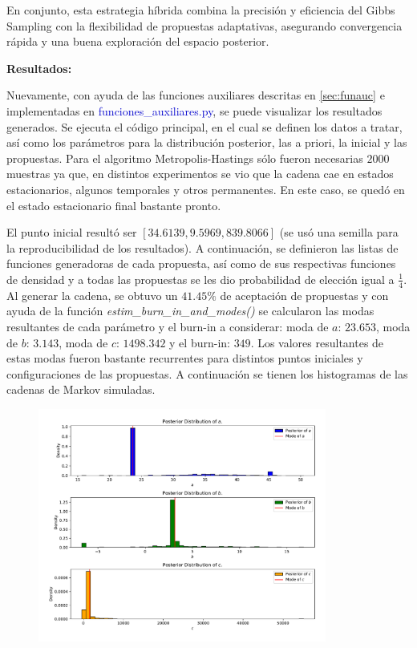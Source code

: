 En conjunto, esta estrategia híbrida combina la precisión y eficiencia del Gibbs Sampling con la flexibilidad de propuestas adaptativas, asegurando convergencia rápida y una buena exploración del espacio posterior.

\textbf{Resultados:}

Nuevamente, con  ayuda de las funciones auxiliares descritas en \ref{sec:funauc} e implementadas en \textcolor{mediumblue}{funciones\_auxiliares.py}, se puede visualizar los resultados generados. Se ejecuta el código principal, en el cual se definen los datos a tratar, así como los parámetros para la distribución posterior, las a priori, la inicial y las propuestas. Para el algoritmo Metropolis-Hastings sólo fueron necesarias $2000$ muestras ya que, en distintos experimentos se vio que la cadena cae en estados estacionarios, algunos temporales y otros permanentes. En este caso, se quedó en el estado estacionario final bastante pronto.

El punto inicial resultó ser $[34.6139, 9.5969, 839.8066]$ (se usó una semilla para la reproducibilidad de los resultados). A continuación, se definieron las listas de funciones generadoras de cada propuesta, así como de sus respectivas funciones de densidad y a todas las propuestas se les dio probabilidad de elección igual a $\frac{1}{4}$. Al generar la cadena, se obtuvo un $41.45\%$ de aceptación de propuestas y con ayuda de la función \textit{estim\_burn\_in\_and\_modes()} se calcularon las modas resultantes de cada parámetro y el burn-in a considerar: moda de $a$: $23.653$, moda de $b$: $3.143$, moda de $c$: $1498.342$ y el burn-in: $349$. Los valores resultantes de estas modas fueron bastante recurrentes para distintos puntos iniciales y configuraciones de las propuestas. A continuación se tienen los histogramas de las cadenas de Markov simuladas.
\begin{figure}[h!]
	\centering
	\includegraphics[width=0.845\textwidth]{IMAGENES/histogram_ex2.pdf}
\end{figure}

